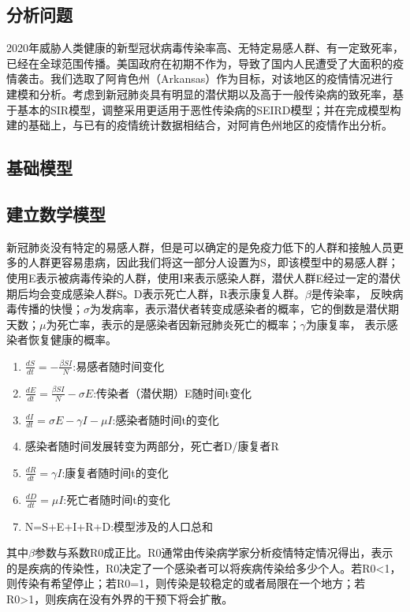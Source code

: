 \documentclass{cumcmthesis}
\begin{document}
\subsection{分析问题}
2020年威胁人类健康的新型冠状病毒传染率高、无特定易感人群、有一定致死率，已经在全球范围传播。美国政府在初期不作为，导致了国内人民遭受了大面积的疫情袭击。我们选取了阿肯色州（Arkansas）作为目标，对该地区的疫情情况进行建模和分析。考虑到新冠肺炎具有明显的潜伏期以及高于一般传染病的致死率，基于基本的SIR模型，调整采用更适用于恶性传染病的SEIRD模型；并在完成模型构建的基础上，与已有的疫情统计数据相结合，对阿肯色州地区的疫情作出分析。
\subsection{基础模型}
\clearpage
\subsection{建立数学模型}
新冠肺炎没有特定的易感人群，但是可以确定的是免疫力低下的人群和接触人员更多的人群更容易患病，因此我们将这一部分人设置为S，即该模型中的易感人群；使用E表示被病毒传染的人群，使用I来表示感染人群，潜伏人群E经过一定的潜伏期后均会变成感染人群S。D表示死亡人群，R表示康复人群。$\beta$是传染率， 反映病毒传播的快慢；$\sigma$为发病率，表示潜伏者转变成感染者的概率，它的倒数是潜伏期天数；$\mu$为死亡率，表示的是感染者因新冠肺炎死亡的概率；$\gamma$为康复率， 表示感染者恢复健康的概率。

\vspace*{0.2cm}
\begin{enumerate}
    \setlength{\itemsep}{2pt}
          \setlength{\parsep}{2pt}
          \setlength{\parskip}{2pt}
    \item $\frac{dS}{dt}= -\frac{\beta SI}{N}$:易感者随时间变化
    \item $\frac{dE}{dt}=\frac{\beta SI}{N}-\sigma E$:传染者（潜伏期）E随时间t变化
    \item $\frac{dI}{dt}=\sigma E-\gamma I- \mu I$:感染者随时间t的变化
    \item 感染者随时间发展转变为两部分，死亡者D/康复者R
    \item $\frac{dR}{dt}=\gamma I$:康复者随时间t的变化
    \item $\frac{dD}{dt}=\mu I$:死亡者随时间t的变化
    \item N=S+E+I+R+D:模型涉及的人口总和
\end{enumerate}

其中$\beta$参数与系数R0成正比。R0通常由传染病学家分析疫情特定情况得出，表示的是疾病的传染性，R0决定了一个感染者可以将疾病传染给多少个人。若R0<1，则传染有希望停止；若R0=1，则传染是较稳定的或者局限在一个地方；若R0>1，则疾病在没有外界的干预下将会扩散。
\end{document}
